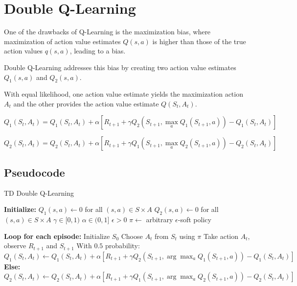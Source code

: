 \documentclass[
  letterpaper,
  DIV=11,
  numbers=noendperiod]{scrreprt}
\begin{document}
\section{Double Q-Learning}\label{double-q-learning-1}

One of the drawbacks of Q-Learning is the maximization bias, where
maximization of action value estimates \(Q(s,a)\) is higher than those
of the true action values \(q(s,a)\), leading to a bias.

Double Q-Learning addresses this bias by creating two action value
estimates \(Q_{1}(s,a)\) and \(Q_{2}(s,a)\).

With equal likelihood, one action value estimate yields the maximization
action \(A_{t}\) and the other provides the action value estimate
\(Q(S_{t}, A_{t})\).

\[
Q_{1}(S_{t},A_{t}) = Q_{1}(S_{t},A_{t}) + \alpha [R_{t+1} + \gamma Q_{2}(S_{t+1},\max_{a} Q_{1}(S_{t+1},a)) - Q_{1}(S_{t},A_{t})]
\]

\[
Q_{2}(S_{t},A_{t}) = Q_{2}(S_{t},A_{t}) + \alpha [R_{t+1} + \gamma Q_{1}(S_{t+1},\max_{a} Q_{2}(S_{t+1},a)) - Q_{2}(S_{t},A_{t})]
\]

\subsection{Pseudocode}\label{pseudocode-12}

\begin{algorithm}[htb!]
\caption{TD Double Q-Learning}
\begin{algorithmic}[1]
\State \textbf{Initialize:}
\State $Q_{1}(s, a) \gets 0$ for all $(s, a) \in S \times A$
\State $Q_{2}(s, a) \gets 0$ for all $(s, a) \in S \times A$
\State $\gamma \in [0, 1)$
\State $\alpha \in (0, 1]$
\State $\epsilon > 0$
\State $\pi \gets$ arbitrary $\epsilon$-soft policy

\State \textbf{Loop for each episode:}
\State Initialize $S_{0}$
\Repeat
  \State Choose $A_{t}$ from $S_{t}$ using $\pi$
  \State Take action $A_{t}$, observe $R_{t+1}$ and $S_{t+1}$
  \State With $0.5$ probability: 
  \State $Q_{1}(S_{t}, A_{t}) \gets Q_{1}(S_{t}, A_{t}) + \alpha [R_{t+1} + \gamma Q_{2}(S_{t+1}, \arg\max_{a} Q_{1}(S_{t+1}, a)) - Q_{1}(S_{t}, A_{t})]$
  \State \textbf{Else:}
  \State $Q_{2}(S_{t}, A_{t}) \gets Q_{2}(S_{t}, A_{t}) + \alpha [R_{t+1} + \gamma Q_{1}(S_{t+1}, \arg\max_{a} Q_{2}(S_{t+1}, a)) - Q_{2}(S_{t}, A_{t})]$

\end{algorithmic}
\end{algorithm}
\end{document}
